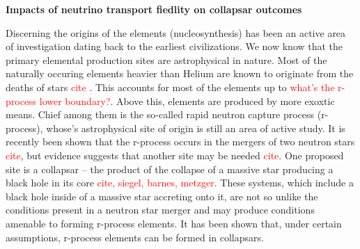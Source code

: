 \documentclass[12pt]{article}
\begin{document}
\setcounter{page}{1}  \renewcommand{\thepage}
           {\arabic{page} }%

\begin{center}
{\bf Impacts of neutrino transport fiedlity on collapsar outcomes} \vspace{-0.15in}
\end{center}




Discerning the origins of the elements (nucleosynthesis) has been an active area of investigation dating back to the earliest civilizations.
We now know that the primary elemental production sites are astrophysical in nature.
Most of the naturally occuring elements heavier than Helium are known to originate from the deaths of stars \textcolor{red}{cite} \citep{mezzacappa:2001}.
This accounts for most of the elements up to \textcolor{red}{what's the r-process lower boundary?}.
Above this, elements are produced by more exoxtic means.
Chief among them is the so-called rapid neutron capture process (r-process), whose's astrophysical site of origin is still an area of active study.
It is recently been shown that the r-process occurs in the mergers of two neutron stars \textcolor{red}{cite}, but evidence suggests that another site may be needed \textcolor{red}{cite}.
One proposed site is a collapsar -- the product of the collapse of a massive star producing a black hole in its core \textcolor{red}{cite, siegel, barnes, metzger}.
These systems, which include a black hole inside of a massive star accreting onto it, are not so unlike the conditions present in a neutron star merger and may produce conditions amenable to forming r-process elements.
It has been shown that, under certain assumptions, r-process elements can be formed in collapsars.
\end{document}

